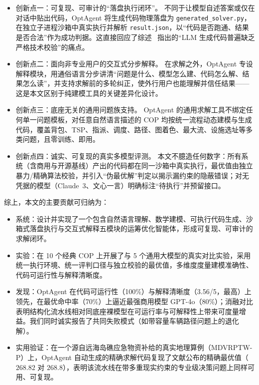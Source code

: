 \documentclass[11pt]{article}
\begin{document}
\begin{itemize}
  \item 创新点一：可复现、可审计的“落盘执行闭环”。 不同于让模型自述答案或仅在对话中贴出代码，OptAgent 将生成代码物理落盘为 \texttt{generated\_solver.py}，在独立子进程沙箱中真实执行并解析 \texttt{result.json}，以“代码是否跑通、结果是否合法”作为成功判据。这直接回应了综述~\cite{daros2026survey} 指出的“LLM 生成代码普遍缺乏严格技术校验”的痛点。
  \item 创新点二：面向非专业用户的交互式分步解释。 在求解之外，OptAgent 专设解释模块，用通俗语言分步讲清“问题是什么、模型怎么建、代码怎么解、结果怎么读”，并支持求解前的多轮纠正，使外行用户也能理解并信任结果——这是本文区别于纯建模工具的关键差异化设计。
  \item 创新点三：底座无关的通用问题族支持。 OptAgent 的通用求解工具不绑定任何单一问题模板，对任意自然语言描述的 COP 均按统一流程动态建模与生成代码，覆盖背包、TSP、指派、调度、路径、图着色、最大流、设施选址等多类问题，且零训练、即用。
  \item 创新点四：诚实、可复现的真实多模型评测。 本文不臆造任何数字：所有系统（含商用与开源基线）产出的代码都在同一沙箱中真实执行，最优值由独立暴力/精确算法校验，并引入“伪最优解”判定以揭示漏约束的隐蔽错误；对无凭据的模型（Claude~3、文心一言）明确标注“待执行”并预留接口。
\end{itemize}

综上，本文的主要贡献可归纳为：

\begin{itemize}
  \item 系统：设计并实现了一个包含自然语言理解、数学建模、可执行代码生成、沙箱式落盘执行与交互式解释五模块的运筹优化智能体，形成可复现、可审计的求解闭环。
  \item 实验：在 10 个经典 COP 上开展了与 5 个通用大模型的真实对比实验，采用统一执行环境、统一评判口径与独立校验的最优值，多维度度量建模准确性、代码可运行性与解释清晰度。
  \item 发现：OptAgent 在代码可运行性（100\%）与解释清晰度（3.56/5，最高）上领先，在最优命中率（70\%）上逼近最强商用模型 GPT-4o（80\%）；消融对比表明结构化流水线相对同底座裸模型在可运行率与可解释性上带来可度量增益。我们同时诚实报告了共同失败模式（如带容量车辆路径问题上的退化解）。
  \item 实用验证：在一个源自远海岛礁应急物资补给的真实地理算例（MDVRPTW-P）上，OptAgent 自动生成的精确求解代码复现了文献公布的精确最优值（$268.82$ 对 $268.8$），表明该流水线在带多重现实约束的专业级决策问题上同样可用、可复现。
\end{itemize}
\end{document}
